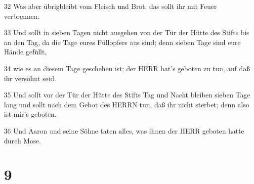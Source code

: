 \par 32 Was aber übrigbleibt vom Fleisch und Brot, das sollt ihr mit Feuer verbrennen.
\par 33 Und sollt in sieben Tagen nicht ausgehen von der Tür der Hütte des Stifts bis an den Tag, da die Tage eures Füllopfers aus sind; denn sieben Tage sind eure Hände gefüllt,
\par 34 wie es an diesem Tage geschehen ist; der HERR hat's geboten zu tun, auf daß ihr versöhnt seid.
\par 35 Und sollt vor der Tür der Hütte des Stifts Tag und Nacht bleiben sieben Tage lang und sollt nach dem Gebot des HERRN tun, daß ihr nicht sterbet; denn also ist mir's geboten.
\par 36 Und Aaron und seine Söhne taten alles, was ihnen der HERR geboten hatte durch Mose.

\chapter{9}

